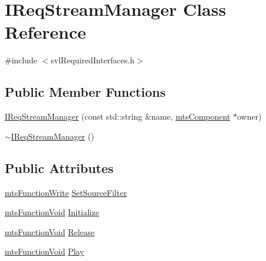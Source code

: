 \hypertarget{class_i_req_stream_manager}{\section{I\-Req\-Stream\-Manager Class Reference}
\label{class_i_req_stream_manager}
}


{\ttfamily \#include $<$svl\-Required\-Interfaces.\-h$>$}

\subsection*{Public Member Functions}
\begin{DoxyCompactItemize}
\item 
\hyperlink{class_i_req_stream_manager_a6bb22b914d1b3c14a3f09f683336fdfa}{I\-Req\-Stream\-Manager} (const std\-::string \&name, \hyperlink{classmts_component}{mts\-Component} $\ast$owner)
\item 
\hyperlink{class_i_req_stream_manager_a0b01f893e54a0971a196df1e9e8f8df4}{$\sim$\-I\-Req\-Stream\-Manager} ()
\end{DoxyCompactItemize}
\subsection*{Public Attributes}
\begin{DoxyCompactItemize}
\item 
\hyperlink{classmts_function_write}{mts\-Function\-Write} \hyperlink{class_i_req_stream_manager_a1574c68fc18c8006f65360a0f7022e53}{Set\-Source\-Filter}
\item 
\hyperlink{classmts_function_void}{mts\-Function\-Void} \hyperlink{class_i_req_stream_manager_ae9d510716e9fefb79d95a727ac939f86}{Initialize}
\item 
\hyperlink{classmts_function_void}{mts\-Function\-Void} \hyperlink{class_i_req_stream_manager_a2f12fc26563af9bb3e035f7758cee301}{Release}
\item 
\hyperlink{classmts_function_void}{mts\-Function\-Void} \hyperlink{class_i_req_stream_manager_ad11164304990fd48f0e5ffb2fc3a75cf}{Play}
\end{DoxyCompactItemize}


